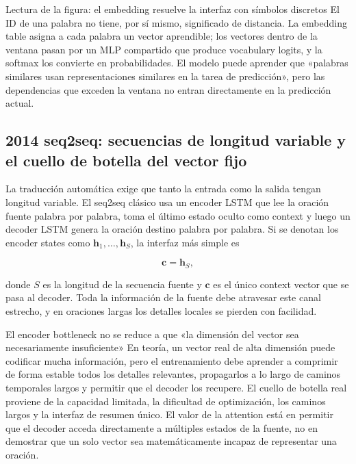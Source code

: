 
\begin{knowledgebox}{Lectura de la figura: el embedding resuelve la interfaz con símbolos discretos}
El ID de una palabra no tiene, por sí mismo, significado de distancia. La embedding table asigna a cada palabra un vector aprendible; los vectores dentro de la ventana pasan por un MLP compartido que produce vocabulary logits, y la softmax los convierte en probabilidades. El modelo puede aprender que «palabras similares usan representaciones similares en la tarea de predicción», pero las dependencias que exceden la ventana no entran directamente en la predicción actual.
\end{knowledgebox}

\subsection{2014 seq2seq: secuencias de longitud variable y el cuello de botella del vector fijo}

La traducción automática exige que tanto la entrada como la salida tengan longitud variable. El seq2seq clásico usa un encoder LSTM que lee la oración fuente palabra por palabra, toma el último estado oculto como context y luego un decoder LSTM genera la oración destino palabra por palabra. Si se denotan los encoder states como $\mathbf h_1,\ldots,\mathbf h_S$, la interfaz más simple es

\[
\mathbf c=\mathbf h_S,
\]

donde $S$ es la longitud de la secuencia fuente y $\mathbf c$ es el único context vector que se pasa al decoder. Toda la información de la fuente debe atravesar este canal estrecho, y en oraciones largas los detalles locales se pierden con facilidad.


\begin{warningbox}{El encoder bottleneck no se reduce a que «la dimensión del vector sea necesariamente insuficiente»}
En teoría, un vector real de alta dimensión puede codificar mucha información, pero el entrenamiento debe aprender a comprimir de forma estable todos los detalles relevantes, propagarlos a lo largo de caminos temporales largos y permitir que el decoder los recupere. El cuello de botella real proviene de la capacidad limitada, la dificultad de optimización, los caminos largos y la interfaz de resumen único. El valor de la attention está en permitir que el decoder acceda directamente a múltiples estados de la fuente, no en demostrar que un solo vector sea matemáticamente incapaz de representar una oración.
\end{warningbox}

